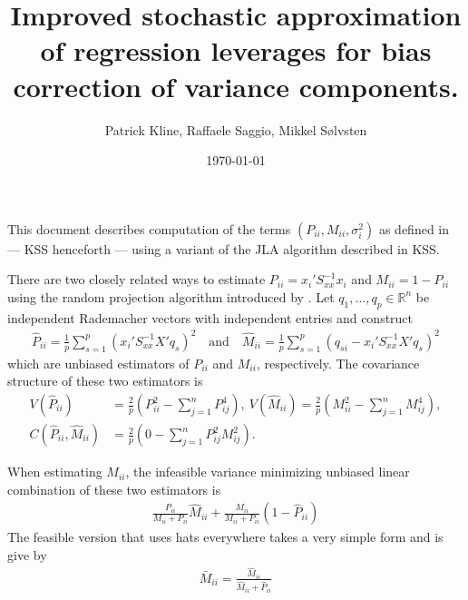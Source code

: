 \documentclass[letterpaper,12pt]{article}
\theoremstyle{remark}
\theoremstyle{definition}
\theoremstyle{plain}
\newcommand\inverse{^{-1}}
\newcommand{\R}{\mathbb{R}}
\begin{document}
\baselineskip20pt

\title{Improved stochastic approximation of regression leverages for bias correction of variance components.}
\author{Patrick Kline, Raffaele Saggio, Mikkel S\o lvsten}

\date{\today}
\maketitle

This document describes computation of the terms $(P_{ii},M_{ii},\sigma_{i}^{2})$ as defined in \cite*{kline2020leave} --- KSS henceforth ---  using a variant of the JLA algorithm described in KSS.  

There are two closely related ways to estimate $P_{ii} = x_i'S_{xx}\inverse x_i$ and $M_{ii} =1-P_{ii}$ using the random projection algorithm introduced by \cite{achlioptas2001database}. Let $q_1,\dots,q_p \in \R^n$ be independent Rademacher vectors with independent entries and construct
\begin{align}
	\hat P_{ii} = \frac{1}{p} \sum_{s=1}^p (x_i'S_{xx}\inverse X'q_s)^2
	\quad \text{and} \quad
	\hat M_{ii} = \frac{1}{p} \sum_{s=1}^p (q_{si} - x_i'S_{xx}\inverse X'q_s)^2
\end{align}
which are unbiased estimators of $P_{ii}$ and $M_{ii}$, respectively. The covariance structure of these two estimators is
\begin{align}
V(\hat P_{ii}) &= \frac{2}{p}\left(P_{ii}^2 - \sum_{j=1}^n P_{ij}^4\right), \
V(\hat M_{ii}) = \frac{2}{p}\left(M_{ii}^2 - \sum_{j=1}^n M_{ij}^4\right), \\
C(\hat P_{ii},\hat M_{ii}) &= \frac{2}{p}\left(0 - \sum_{j=1}^n P_{ij}^2 M_{ij}^2\right).
\end{align}

When estimating $M_{ii}$, the infeasible variance minimizing unbiased linear combination of these two estimators is
\begin{align}
\frac{P_{ii}}{M_{ii} + P_{ii}} \hat M_{ii} + \frac{M_{ii}}{M_{ii} + P_{ii}} (1-\hat P_{ii})
\end{align}
The feasible version that uses hats everywhere takes a very simple form and is give by
\begin{align}\label{eq:kicksass}
	\bar M_{ii} = \frac{\hat M_{ii}}{\hat M_{ii} + \hat P_{ii}}
\end{align}
\end{document}
